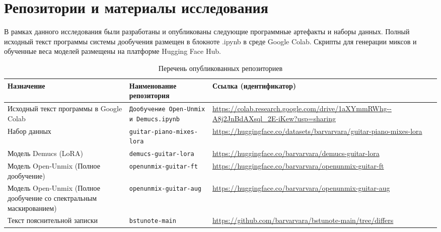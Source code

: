 \documentclass[14pt]{extarticle}
\begin{document}
%


\appendix


\section{Репозитории и материалы исследования}
\label{appendix:repositories}

В рамках данного исследования были разработаны и опубликованы следующие программные артефакты и наборы данных. 
Полный исходный текст программы системы дообучения размещен в блокноте .ipynb в среде Google Colab.
Скрипты для генерации миксов и обученные веса моделей размещены на платформе Hugging Face Hub.

\begin{table}[ht]
\centering
\caption{Перечень опубликованных репозиториев}
\label{tab:repo_list}
\small
\renewcommand{\arraystretch}{1.2}
\begin{tabular}{|p{}|p{}|p{}|}
\hline
\textbf{Назначение} & \textbf{Наименование репозитория} & \textbf{Ссылка (идентификатор)} \\ \hline
Исходный текст программы в Google Colab & \texttt{Дообучение Open-Unmix и Demucs.ipynb} & \url{https://colab.research.google.com/drive/1aXYmmRWhg--A8j2JnBdAXsql_2E-iKew?usp=sharing} \\ \hline
Набор данных & \texttt{guitar-piano-mixes-lora} & \url{https://huggingface.co/datasets/barvarvara/guitar-piano-mixes-lora} \\ \hline
Модель Demucs (LoRA) & \texttt{demucs-guitar-lora} & \url{https://huggingface.co/barvarvara/demucs-guitar-lora} \\ \hline
Модель Open-Unmix (Полное дообучение) & \texttt{openunmix-guitar-ft} & \url{https://huggingface.co/barvarvara/openunmix-guitar-ft} \\ \hline
Модель Open-Unmix (Полное дообучение со спектральным маскированием) & \texttt{openunmix-guitar-aug} & \url{https://huggingface.co/barvarvara/openunmix-guitar-aug} \\ \hline
Текст пояснительной записки & \texttt{bstunote-main} & \url{https://github.com/barvarvara/bstunote-main/tree/differs} \\ \hline
\end{tabular}
\end{table}
\end{document}
